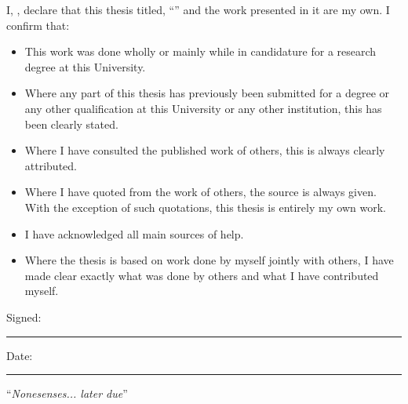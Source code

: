 \documentclass[
12pt, %
oneside, %
english, %
onehalfspacing, %
headsepline, %
]{Structural} %
\begin{document}

\begin{declaration}
\addchaptertocentry{\authorshipname} %
\noindent I, \authorname, declare that this thesis titled, \enquote{\ttitle} and the work presented in it are my own. I confirm that:

\begin{itemize} 
\item This work was done wholly or mainly while in candidature for a research degree at this University.
\item Where any part of this thesis has previously been submitted for a degree or any other qualification at this University or any other institution, this has been clearly stated.
\item Where I have consulted the published work of others, this is always clearly attributed.
\item Where I have quoted from the work of others, the source is always given. With the exception of such quotations, this thesis is entirely my own work.
\item I have acknowledged all main sources of help.
\item Where the thesis is based on work done by myself jointly with others, I have made clear exactly what was done by others and what I have contributed myself.\\
\end{itemize}
 
\noindent Signed:\\
\rule[0.5em]{25em}{0.5pt} %
 
\noindent Date:\\
\rule[0.5em]{25em}{0.5pt} %
\end{declaration}

\cleardoublepage


\vspace*{0.2\textheight}

\noindent\enquote{\itshape Nonesenses... later due}\bigbreak
\end{document}

